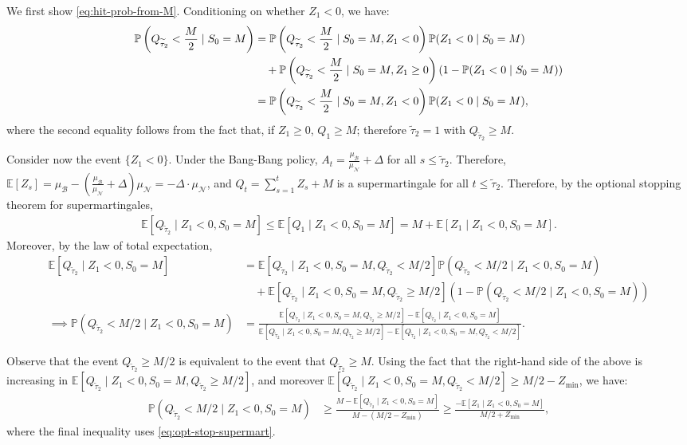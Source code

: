 \documentclass[mnsc,nonblindrev]{informs3}
\newcommand{\E}{\mathbb{E}}
\newcommand{\pr}{\mathbb{P}}
\renewcommand{\Pr}{\pr}
\newcommand{\NDist}{\mathcal{N}}
\newcommand{\BDist}{\mathcal{B}}
\newcommand{\Nmean}{\mu_{\NDist}}
\newcommand{\Bmean}{\mu_{\BDist}}
\newcommand{\ALG}{{Bang-Bang}\xspace}
\newcommand{\Ttauhigh}{\widetilde{\tau}_2}
\renewenvironment{proof}[1][Proof]{%
  \par\noindent{\itshape #1.} \ignorespaces
}{%
  \hfill\Halmos\par
}
\begin{document}
\begin{APPENDICES}
\HitProbabilityLemma*

\begin{proof}
We first show \cref{eq:hit-prob-from-M}. 
Conditioning on whether $Z_1 < 0$, we have:
\begin{align}\label{eq:first-lem}
\Pr\left(Q_{\Ttauhigh} < \frac{M}{2} \mid S_0 = M\right) &= \Pr\left(Q_{\Ttauhigh} < \frac{M}{2} \mid S_0 = M, Z_1 < 0\right) \Pr(Z_1 < 0 \mid S_0 = M) \notag \\ &\quad + \Pr\left(Q_{\Ttauhigh} < \frac{M}{2} \mid S_0 = M, Z_1 \geq 0\right)\left(1-\Pr(Z_1 < 0 \mid S_0 = M)\right) \notag \\
&= \Pr\left(Q_{\Ttauhigh} < \frac{M}{2} \mid S_0 = M, Z_1 < 0\right) \Pr(Z_1 < 0 \mid S_0 = M),
\end{align}
where the second equality follows from the fact that, if $Z_1 \geq 0$, $Q_1 \geq M$; therefore $\Ttauhigh = 1$ with $Q_{\Ttauhigh} \geq M$.

Consider now the event $\{Z_1 < 0\}$. Under the \ALG policy, $A_t = \frac{\Bmean}{\Nmean} + \Delta$ for all $s \leq  \Ttauhigh$. Therefore, \mbox{$\E[Z_s] = \Bmean - (\frac{\Bmean}{\Nmean} + \Delta)\Nmean =  -\Delta \cdot \Nmean$}, and $Q_t = \sum_{s=1}^t Z_s + M$ is a supermartingale for all $t \leq \Ttauhigh$. Therefore, by the optional stopping theorem for supermartingales,
\begin{align}\label{eq:opt-stop-supermart}
\E[Q_{\Ttauhigh} \mid Z_1 < 0, S_0 = M] \leq \E[Q_1 \mid Z_1 < 0, S_0 = M] = M + \E[Z_1 \mid Z_1 < 0, S_0 = M].
\end{align}
Moreover, by the law of total expectation,
\begin{align*}
\E[Q_{\Ttauhigh} \mid Z_1 < 0, S_0 = M] &= \E[Q_{\Ttauhigh} \mid Z_1 < 0, S_0 = M, Q_{\Ttauhigh} < M/2]\Pr\left(Q_{\Ttauhigh} < M/2 \mid Z_1 < 0, S_0 = M\right) \\& \quad+ \E[Q_{\Ttauhigh} \mid Z_1 < 0, S_0 = M, Q_{\Ttauhigh} \geq M/2]\left(1-\Pr\left(Q_{\Ttauhigh} < M/2 \mid Z_1 < 0, S_0 = M\right)\right) \\
\implies \Pr\left(Q_{\Ttauhigh} < M/2 \mid Z_1 < 0, S_0 = M\right) &= \frac{\E[Q_{\Ttauhigh} \mid Z_1 < 0, S_0 = M, Q_{\Ttauhigh} \geq M/2]-\E[Q_{\Ttauhigh} \mid Z_1 < 0, S_0 = M]}{\E[Q_{\Ttauhigh} \mid Z_1 < 0, S_0 = M, Q_{\Ttauhigh} \geq M/2]-\E[Q_{\Ttauhigh} \mid Z_1 < 0, S_0 = M, Q_{\Ttauhigh} < M/2]}.
\end{align*}



Observe that the event $Q_{\Ttauhigh} \geq M/2$ is equivalent to the event that $Q_{\Ttauhigh} \geq M$. Using the fact that the right-hand side of the above is increasing in $\E[Q_{\Ttauhigh} \mid Z_1 < 0, S_0 = M, Q_{\Ttauhigh} \geq M/2]$, and moreover $\E[Q_{\Ttauhigh} \mid Z_1 < 0, S_0 = M, Q_{\Ttauhigh} < M/2] \geq M/2-Z_{\min}$, we have:
\begin{align*}
\Pr\left(Q_{\Ttauhigh} < M/2 \mid Z_1 < 0, S_0 = M\right) &\geq \frac{M-\E[Q_{\Ttauhigh} \mid Z_1 < 0, S_0 = M]}{M-(M/2-Z_{\min})}\geq \frac{-\E[Z_1 \mid Z_1 < 0, S_0 = M]}{M/2+Z_{\min}},
\end{align*}
where the final inequality uses \eqref{eq:opt-stop-supermart}.


\end{proof}
\end{APPENDICES}
\end{document}

